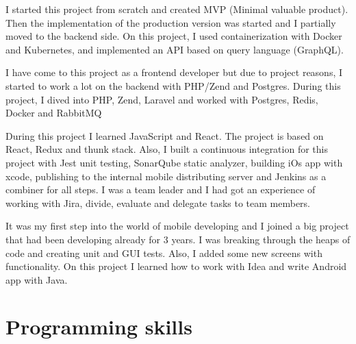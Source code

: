 \documentclass[11pt,a4paper,sans]{moderncv} %
\begin{document}
{I started this project from scratch and created MVP (Minimal valuable product). Then the implementation of the production version was started and I partially moved to the backend side. On this project, I used containerization with Docker and Kubernetes, and implemented an API based on query language (GraphQL). }

{I have come to this project as a frontend developer but due to project reasons, I started to work a lot on the backend with PHP/Zend and Postgres. During this project, I dived into PHP, Zend, Laravel and worked with Postgres, Redis, Docker and RabbitMQ}

{During this project I learned JavaScript and React. The project is based on React, Redux and thunk stack. Also, I built a continuous integration for this project with Jest unit testing, SonarQube static analyzer, building iOs app with xcode, publishing to the internal mobile distributing server and Jenkins as a combiner for all steps. I was a team leader and I had got an experience of working with Jira, divide, evaluate and delegate tasks to team members.}

{It was my first step into the world of mobile developing and I joined a big project that had been developing already for 3 years. I was breaking through the heaps of code and creating unit and GUI tests. Also, I added some new screens with functionality. On this project I learned how to work with Idea and write Android app with Java.}



\section{Programming skills}
\end{document}

